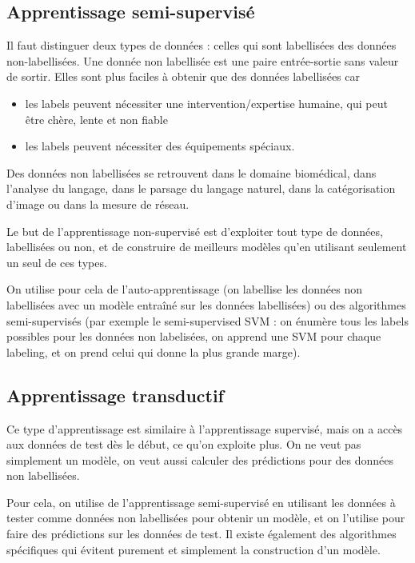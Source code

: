 		\subsection{Apprentissage semi-supervisé}
		
		Il faut distinguer deux types de données : celles qui sont labellisées des données non-labellisées. Une donnée non labellisée est une paire entrée-sortie sans valeur de sortir. Elles sont plus faciles à obtenir que des données labellisées car
		
		\begin{itemize}
			\item les labels peuvent nécessiter une intervention/expertise humaine, qui peut être chère, lente et non fiable
			\item les labels peuvent nécessiter des équipements spéciaux.
		\end{itemize}
		
		Des données non labellisées se retrouvent dans le domaine biomédical, dans l'analyse du langage, dans le parsage du langage naturel, dans la catégorisation d'image ou dans la mesure de réseau.
				
		Le but de l'apprentissage non-supervisé est d'exploiter tout type de données, labellisées ou non, et de construire de meilleurs modèles qu'en utilisant seulement un seul de ces types.
		
		On utilise pour cela de l'auto-apprentissage (on labellise les données non labellisées avec un modèle entraîné sur les données labellisées) ou des algorithmes semi-supervisés (par exemple le semi-supervised SVM : on énumère tous les labels possibles pour les données non labelisées, on apprend une SVM pour chaque labeling, et on prend celui qui donne la plus grande marge).
		
		\subsection{Apprentissage transductif}
		
		Ce type d'apprentissage est similaire à l'apprentissage supervisé, mais on a accès aux données de test dès le début, ce qu'on exploite plus. On ne veut pas simplement un modèle, on veut aussi calculer des prédictions pour des données non labellisées.
		
		Pour cela, on utilise de l'apprentissage semi-supervisé en utilisant les données à tester comme données non labellisées  pour obtenir un modèle, et on l'utilise pour faire des prédictions sur les données de test. Il existe également des algorithmes spécifiques qui évitent purement et simplement la construction d'un modèle.
		
